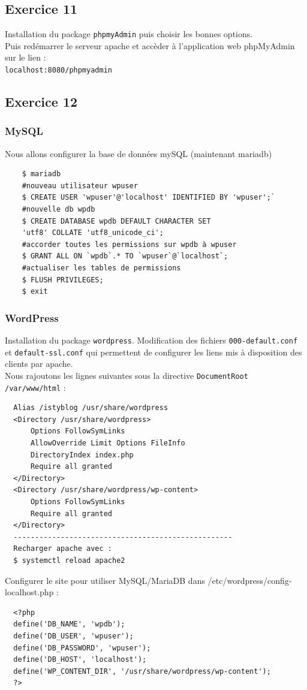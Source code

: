 \documentclass{report}
\begin{document}
\subsection{Exercice 11}
Installation du package \texttt{phpmyAdmin} puis choisir les bonnes options.\\
Puis redémarrer le serveur apache et accèder à l'application web phpMyAdmin sur le lien : \\
\texttt{localhost:8080/phpmyadmin}

\subsection{Exercice 12}
\subsubsection{MySQL}
Nous allons configurer la base de données mySQL (maintenant mariadb)
\begin{tcolorbox}
  \begin{verbatim}
    $ mariadb
    #nouveau utilisateur wpuser
    $ CREATE USER 'wpuser'@'localhost' IDENTIFIED BY 'wpuser';`
    #nouvelle db wpdb
    $ CREATE DATABASE wpdb DEFAULT CHARACTER SET
    'utf8' COLLATE 'utf8_unicode_ci';
    #accorder toutes les permissions sur wpdb à wpuser
    $ GRANT ALL ON `wpdb`.* TO `wpuser`@`localhost`;
    #actualiser les tables de permissions
    $ FLUSH PRIVILEGES;
    $ exit
  \end{verbatim}
\end{tcolorbox}
\subsubsection{WordPress}
Installation du package \texttt{wordpress}.
Modification des fichiers \texttt{000-default.conf} et \texttt{default-ssl.conf} qui permettent
de configurer les liens mis à disposition des clients par apache.\\
Nous rajoutons les lignes suivantes sous la directive \texttt{DocumentRoot /var/www/html} :
\begin{tcolorbox}
  \begin{verbatim}
  Alias /istyblog /usr/share/wordpress
  <Directory /usr/share/wordpress>
      Options FollowSymLinks
      AllowOverride Limit Options FileInfo
      DirectoryIndex index.php
      Require all granted
  </Directory>
  <Directory /usr/share/wordpress/wp-content>
      Options FollowSymLinks
      Require all granted
  </Directory>
  ---------------------------------------------------
  Recharger apache avec :
  $ systemctl reload apache2
  \end{verbatim}
\end{tcolorbox}
Configurer le site pour utiliser MySQL/MariaDB dans /etc/wordpress/config-localhost.php :
\begin{tcolorbox}
  \begin{verbatim}
  <?php
  define('DB_NAME', 'wpdb');
  define('DB_USER', 'wpuser');
  define('DB_PASSWORD', 'wpuser');
  define('DB_HOST', 'localhost');
  define('WP_CONTENT_DIR', '/usr/share/wordpress/wp-content');
  ?>
  \end{verbatim}
\end{tcolorbox}
\end{document}
